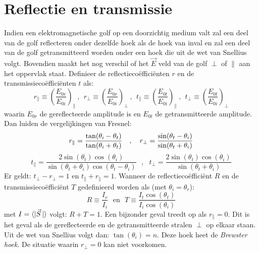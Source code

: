 \documentclass[twoside]{report}
\begin{document}
\section{Reflectie en transmissie}
Indien een elektromagnetische golf op een doorzichtig medium valt zal een deel
van de golf reflecteren onder dezelfde hoek als de hoek van inval en zal een
deel van de golf getransmitteerd worden onder een hoek die uit de wet van
Snellius volgt. Bovendien maakt het nog verschil of het $\vec{E}$ veld van
de golf $\perp$ of $\parallel$ aan het oppervlak staat. Definieer de
reflectieco\"effici\"enten $r$ en de transmissieco\"effici\"enten $t$ als:
\[
r_\parallel\equiv\left(\frac{E_{0r}}{E_{0i}}\right)_\parallel~,~~
r_\perp\equiv\left(\frac{E_{0r}}{E_{0i}}\right)_\perp~,~~
t_\parallel\equiv\left(\frac{E_{0t}}{E_{0i}}\right)_\parallel~,~~
t_\perp\equiv\left(\frac{E_{0t}}{E_{0i}}\right)_\perp
\]
waarin $E_{0r}$ de gereflecteerde amplitude is en $E_{0t}$ de getransmitteerde
amplitude. Dan luiden de vergelijkingen van Fresnel:
\[
r_\parallel=\frac{\tan(\theta_i-\theta_t)}{\tan(\theta_i+\theta_t)}~~~,~~~
r_\perp    =\frac{\sin(\theta_t-\theta_i)}{\sin(\theta_t+\theta_i)}\\
\]
\[
t_\parallel=\frac{2\sin(\theta_t)\cos(\theta_i)}{\sin(\theta_t+\theta_i)\cos(\theta_t-\theta_i)}~~~,~~~
t_\perp    =\frac{2\sin(\theta_t)\cos(\theta_i)}{\sin(\theta_t+\theta_i)}
\]
Er geldt: $t_\perp-r_\perp=1$ en $t_\parallel+r_\parallel=1$. Wanneer de
reflectieco\"effici\"ent $R$ en de transmissieco\"effici\"ent $T$
gedefinieerd worden als (met $\theta_i=\theta_r$):
\[
R\equiv\frac{I_r}{I_i}~~~\mbox{en}~~~T\equiv\frac{I_t\cos(\theta_t)}{I_i\cos(\theta_i)}
\]
met $I=\langle|\vec{S}\,|\rangle$ volgt: $R+T=1$. Een bijzonder geval treedt op
als $r_\parallel=0$. Dit is het geval als de gereflecteerde en de getransmitteerde
stralen $\perp$ op elkaar staan. Uit de wet van Snellius volgt dan:
$\tan(\theta_i)=n$. Deze hoek heet de {\it Brewster hoek}. De situatie waarin
$r_\perp=0$ kan niet voorkomen.
\end{document}

